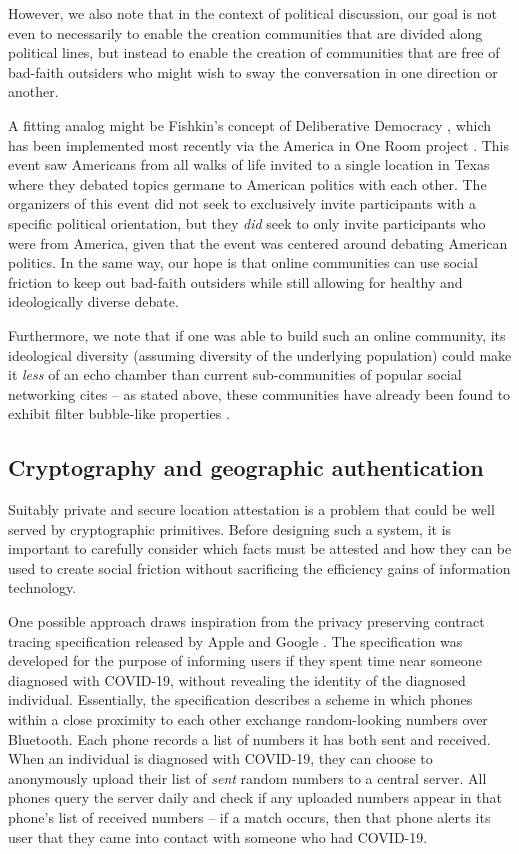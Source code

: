 \documentclass[sigconf,authordraft]{acmart}
\begin{document}
However, we also note that in the context of political discussion, our goal is not even to necessarily to enable the creation communities that are divided along political lines, but instead to enable the creation of communities that are free of bad-faith outsiders who might wish to sway the conversation in one direction or another. 

A fitting analog might be Fishkin's concept of Deliberative Democracy \cite{fishkin1991democracy}, which has been implemented most recently via the America in One Room project \cite{AmericaInOneRoom}. This event saw Americans from all walks of life invited to a single location in Texas where they debated topics germane to American politics with each other. The organizers of this event did not seek to exclusively invite participants with a specific political orientation, but they {\itshape did} seek to only invite participants who were from America, given that the event was centered around debating American politics. In the same way, our hope is that online communities can use social friction to keep out bad-faith outsiders while still allowing for healthy and ideologically diverse debate.

Furthermore, we note that if one was able to build such an online community, its ideological diversity (assuming diversity of the underlying population) could make it {\itshape less} of an echo chamber than current sub-communities of popular social networking cites -- as stated above, these communities have already been found to exhibit filter bubble-like properties \cite{garimella2018political}.

\subsection{Cryptography and geographic authentication}


Suitably private and secure location attestation is a problem that could be well served by cryptographic primitives. Before designing such a system, it is important to carefully consider which facts must be attested and how they can be used to create social friction without sacrificing the efficiency gains of information technology.

One possible approach draws inspiration from the privacy preserving contract tracing specification released by Apple and Google \cite{contact_tracing_spec}. The specification was developed for the purpose of informing users if they spent time near someone diagnosed with COVID-19, without revealing the identity of the diagnosed individual. Essentially, the specification describes a scheme in which phones within a close proximity to each other exchange random-looking numbers over Bluetooth. Each phone records a list of numbers it has both sent and received. When an individual is diagnosed with COVID-19, they can choose to anonymously upload their list of {\itshape sent} random numbers to a central server. All phones query the server daily and check if any uploaded numbers appear in that phone's list of received numbers -- if a match occurs, then that phone alerts its user that they came into contact with someone who had COVID-19. 
\end{document}
